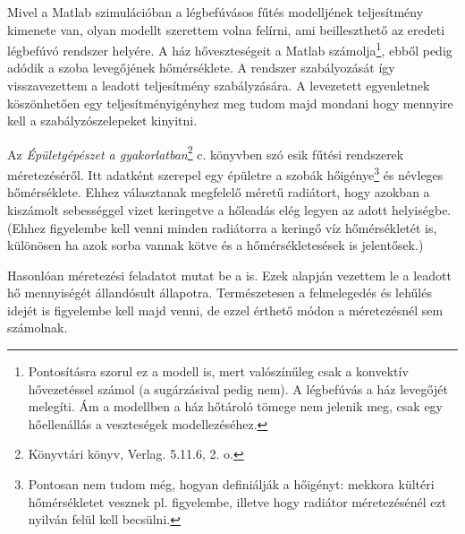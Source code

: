 




\begin{formal}
Mivel a Matlab szimulációban a légbefúvásos fűtés modelljének teljesítmény kimenete van, olyan modellt szerettem volna felírni, ami beilleszthető az eredeti légbefúvó rendszer helyére. A ház hőveszteségeit a Matlab számolja\footnote{Pontosításra szorul ez a modell is, mert valószínűleg csak a konvektív hővezetéssel számol (a sugárzásival pedig nem). A légbefúvás a ház levegőjét melegíti. Ám a modellben a ház hőtároló tömege nem jelenik meg, csak egy hőellenállás a veszteségek modellezéséhez.}, ebből pedig adódik a szoba levegőjének hőmérséklete. A rendszer szabályozását így visszavezettem a leadott teljesítmény szabályzására. A levezetett egyenletnek köszönhetően egy teljesítményigényhez meg tudom majd mondani hogy mennyire kell a szabályzószelepeket kinyitni.


Az \textit{Épületgépészet a gyakorlatban}\footnote{Könyvtári könyv, Verlag. 5.11.6, 2. o.} c. könyvben szó esik fűtési rendszerek méretezéséről. Itt adatként szerepel egy épületre a szobák hőigénye\footnote{Pontosan nem tudom még, hogyan definiálják a hőigényt: mekkora kültéri hőmérsékletet vesznek pl. figyelembe, illetve hogy radiátor méretezésénél ezt nyilván felül kell becsülni.} és névleges hőmérséklete. Ehhez választanak megfelelő méretű radiátort, hogy azokban a kiszámolt sebességgel vizet keringetve a hőleadás elég legyen az adott helyiségbe.
{\scriptsize(Ehhez figyelembe kell venni minden radiátorra a keringő víz hőmérsékletét is, különösen ha azok sorba vannak kötve és a hőmérsékletesések is jelentősek.)}


Hasonlóan méretezési feladatot mutat be a \cite[4.2.7.3]{Herz} is. Ezek alapján vezettem le a leadott hő mennyiségét állandósult állapotra. Természetesen a felmelegedés és lehűlés idejét is figyelembe kell majd venni, de ezzel érthető módon a méretezésnél sem számolnak.%
\end{formal}
